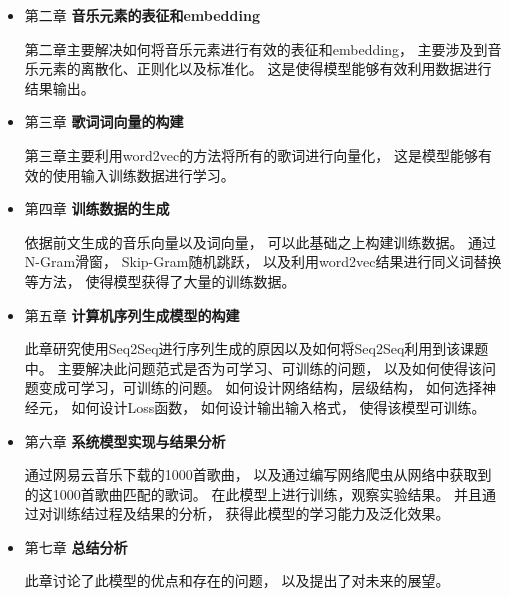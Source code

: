 \begin{itemize}

\item 第二章 \textbf{音乐元素的表征和embedding}

第二章主要解决如何将音乐元素进行有效的表征和embedding， 主要涉及到音乐元素的离散化、正则化以及标准化。 这是使得模型能够有效利用数据进行结果输出。 

\item 第三章 \textbf{歌词词向量的构建}

第三章主要利用word2vec的方法将所有的歌词进行向量化， 这是模型能够有效的使用输入训练数据进行学习。

\item 第四章 \textbf{训练数据的生成}

依据前文生成的音乐向量以及词向量， 可以此基础之上构建训练数据。 通过N-Gram滑窗， Skip-Gram随机跳跃， 以及利用word2vec结果进行同义词替换等方法， 使得模型获得了大量的训练数据。 


\item 第五章 \textbf{计算机序列生成模型的构建}

此章研究使用Seq2Seq进行序列生成的原因以及如何将Seq2Seq利用到该课题中。 主要解决此问题范式是否为可学习、可训练的问题， 以及如何使得该问题变成可学习，可训练的问题。 如何设计网络结构，层级结构， 如何选择神经元， 如何设计Loss函数， 如何设计输出输入格式， 使得该模型可训练。 

\item 第六章 \textbf{系统模型实现与结果分析}

通过网易云音乐下载的1000首歌曲， 以及通过编写网络爬虫从网络中获取到的这1000首歌曲匹配的歌词。 在此模型上进行训练，观察实验结果。 并且通过对训练结过程及结果的分析， 获得此模型的学习能力及泛化效果。 



\item 第七章 \textbf{总结分析}

此章讨论了此模型的优点和存在的问题， 以及提出了对未来的展望。 

\end{itemize}
